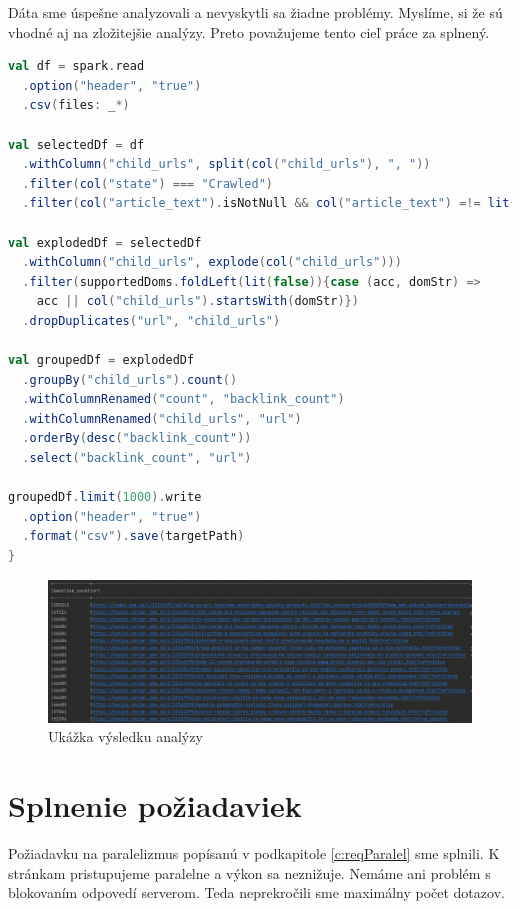 Dáta sme úspešne analyzovali a nevyskytli sa žiadne problémy. Myslíme, si že sú vhodné aj na zložitejšie analýzy. Preto považujeme tento cieľ práce za splnený.

\begin{lstlisting}[language=Scala,caption={Primitívna backlink analýza v Apache Spark}]
val df = spark.read
  .option("header", "true")
  .csv(files: _*)

val selectedDf = df
  .withColumn("child_urls", split(col("child_urls"), ", "))
  .filter(col("state") === "Crawled")
  .filter(col("article_text").isNotNull && col("article_text") =!= lit(""))

val explodedDf = selectedDf
  .withColumn("child_urls", explode(col("child_urls")))
  .filter(supportedDoms.foldLeft(lit(false)){case (acc, domStr) =>
    acc || col("child_urls").startsWith(domStr)})
  .dropDuplicates("url", "child_urls")

val groupedDf = explodedDf
  .groupBy("child_urls").count()
  .withColumnRenamed("count", "backlink_count")
  .withColumnRenamed("child_urls", "url")
  .orderBy(desc("backlink_count"))
  .select("backlink_count", "url")

groupedDf.limit(1000).write
  .option("header", "true")
  .format("csv").save(targetPath)
}
\end{lstlisting}\label{code:backlink}

\begin{figure}[!ht]
    \centering
    \includegraphics[width=1\textwidth]{figures/analExample.png}
    \caption{Ukážka výsledku analýzy\label{o:analRes}}
\end{figure}



\section{Splnenie požiadaviek}
Požiadavku na paralelizmus popísanú v podkapitole \ref{c:reqParalel} sme splnili. K stránkam pristupujeme paralelne a výkon sa neznižuje. Nemáme ani problém s blokovaním odpovedí serverom. Teda neprekročili sme maximálny počet dotazov. 

